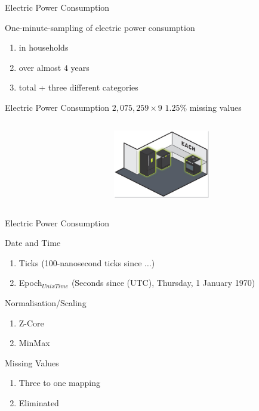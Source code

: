 \begin{frame}{Electric Power Consumption}


\bi
\mi One-minute-sampling of electric power consumption  
\begin{enumerate}
    \item in households
    \item over almost $4$ years
    \item total + three different categories 

  \end{enumerate}
\mi Electric Power Consumption
\mi $2,075,259\times9$
\mi $1.25\%$ missing values
\ei
\begin{columns}[t] %
     \begin{column}[T]{7cm} %
     
     \end{column}
     \begin{column}[T]{5cm} %
          \includegraphics[height=3cm]{fig/each.jpg}
     \end{column}
 \end{columns}

\end{frame}

\begin{frame}{Electric Power Consumption}

\begin{tcolorbox}[colback=LightSteelBlue!5,colframe=yellow!40!black,title=Preprocessing]

\bi
\mi Date and Time
\begin{enumerate}
    \item Ticks {\tiny (100-nanosecond ticks since $\ldots$)}
    \item Epoch$_{Unix Time}$ {\tiny (Seconds since (UTC), Thursday, 1
    January 1970) }
  \end{enumerate}
\mi Normalisation/Scaling
\begin{enumerate}
    \item Z-Core 
    \item MinMax 
  \end{enumerate}
  
  \mi Missing Values
\begin{enumerate}
    \item Three to one mapping 
    \item Eliminated
  \end{enumerate}
\ei


\end{tcolorbox}
\end{frame}

